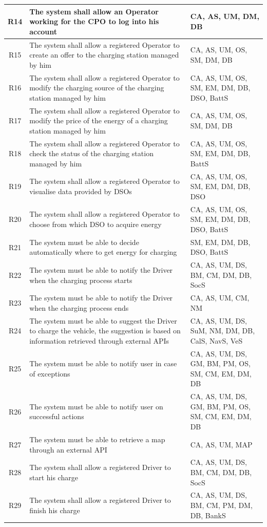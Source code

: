 \documentclass[../main.tex]{subfiles}
\begin{document}
\begin{center}
\begin{longtable}{| c | p{9cm} | p{5cm} | }
\hline
R14 & The system shall allow an Operator working for the CPO to log into his account
& CA, AS, UM, DM, DB\\
\hline
R15 & The system shall allow a registered Operator to create an offer to the charging station managed by him
& CA, AS, UM, OS, SM, DM, DB\\
\hline
R16 & The system shall allow a registered Operator to modify the charging source of the charging station managed by him
& CA, AS, UM, OS, SM, EM, DM, DB, DSO, BattS\\
\hline
R17 & The system shall allow a registered Operator to modify the price of the energy of a charging station managed by him
& CA, AS, UM, OS, SM, DM, DB\\
\hline
R18 & The system shall allow a registered Operator to check the status of the charging station managed by him
& CA, AS, UM, OS, SM, EM, DM, DB, BattS\\
\hline
R19 & The system shall allow a registered Operator to visualise data provided by DSOs
& CA, AS, UM, OS, SM, EM, DM, DB, DSO\\
\hline
R20 & The system shall allow a registered Operator to choose from which DSO to acquire energy & CA, AS, UM, OS, SM, EM, DM, DB, DSO, BattS
\\
\hline
R21 & The system must be able to decide automatically where to get energy for charging & SM, EM, DM, DB, DSO, BattS
\\
\hline
R22 & The system must be able to notify the Driver when the charging process starts & CA, AS, UM, DS, BM, CM, DM, DB, SocS
\\
\hline
R23 & The system must be able to notify the Driver when the charging process ends & CA, AS, UM, CM, NM
\\
\hline
R24 & The system must be able to suggest the Driver to charge the vehicle, the suggestion is based on information retrieved through external APIs & CA, AS, UM, DS, SuM, NM, DM, DB, CalS, NavS, VeS\\
\hline
R25 & The system must be able to notify user in case of exceptions & CA, AS, UM, DS, GM, BM, PM,  OS, SM, CM, EM, DM, DB
\\
\hline
R26 & The system must be able to notify user on successful actions & CA, AS, UM, DS, GM, BM, PM,  OS, SM, CM, EM, DM, DB
\\
\hline
R27 & The system must be able to retrieve a map through an external API & CA, AS, UM, MAP
\\
\hline
R28 & The system shall allow a registered Driver to start his charge & CA, AS, UM, DS, BM, CM, DM, DB, SocS
\\
\hline
R29 & The system shall allow a registered Driver to finish his charge & CA, AS, UM, DS, BM, CM, PM, DM, DB, BankS
\\
\hline
\end{longtable}
\end{center}
\end{document}
